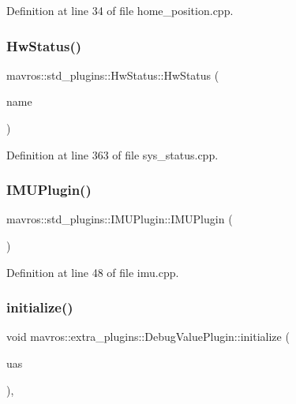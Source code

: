 Definition at line 34 of file home\+\_\+position.\+cpp.

\mbox{\label{group__plugin_ga11b96d7caa88529a91eb7955a253d331}} 
\subsubsection{\texorpdfstring{HwStatus()}{HwStatus()}}
{\footnotesize\ttfamily mavros\+::std\+\_\+plugins\+::\+Hw\+Status\+::\+Hw\+Status (\begin{DoxyParamCaption}\item[{const std\+::string \&}]{name }\end{DoxyParamCaption})\hspace{0.3cm}{\ttfamily [inline]}}



Definition at line 363 of file sys\+\_\+status.\+cpp.

\mbox{\label{group__plugin_gacec05dbf6f6696b457df134f2b92c3e8}} 
\subsubsection{\texorpdfstring{IMUPlugin()}{IMUPlugin()}}
{\footnotesize\ttfamily mavros\+::std\+\_\+plugins\+::\+I\+M\+U\+Plugin\+::\+I\+M\+U\+Plugin (\begin{DoxyParamCaption}{ }\end{DoxyParamCaption})\hspace{0.3cm}{\ttfamily [inline]}}



Definition at line 48 of file imu.\+cpp.

\mbox{\label{group__plugin_ga2f1235653fca1e9789a8e0842db27743}} 
\subsubsection{\texorpdfstring{initialize()}{initialize()}\hspace{0.1cm}{\footnotesize\ttfamily [1/41]}}
{\footnotesize\ttfamily void mavros\+::extra\+\_\+plugins\+::\+Debug\+Value\+Plugin\+::initialize (\begin{DoxyParamCaption}\item[{\mbox{\hyperlink{classmavros_1_1UAS}{U\+AS}} \&}]{uas }\end{DoxyParamCaption})\hspace{0.3cm}{\ttfamily [inline]}, {\ttfamily [virtual]}}




